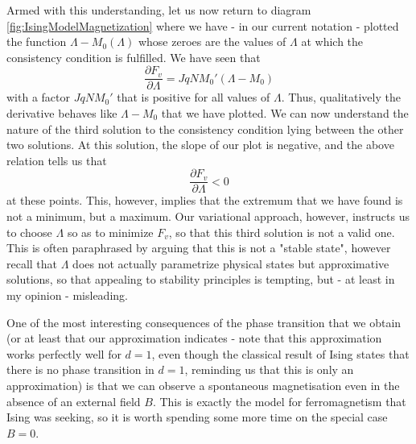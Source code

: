 \documentclass[a4paper, draft]{article}
\theoremstyle{own}
\theoremstyle{remark}
\begin{document}
Armed with this understanding, let us now return to diagram \ref{fig:IsingModelMagnetization} where we have - in our current notation - plotted the function $\Lambda - M_0(\Lambda)$ whose zeroes are the values of $\Lambda$ at which the consistency condition is fulfilled. We have seen that
$$
\frac{\partial F_v}{\partial \Lambda} = J  q N M_0' (\Lambda -   M_0) 
$$
with a factor $J q N M_0'$ that is positive for all values of $\Lambda$. Thus, qualitatively the derivative behaves like $\Lambda - M_0$ that we have plotted. We can now understand the nature of the third solution to the consistency condition lying between the other two solutions. At this solution, the slope of our plot is negative, and the above relation tells us that 
$$
\frac{\partial F_v}{\partial \Lambda} < 0
$$
at these points. This, however, implies that the extremum that we have found is not a minimum, but a maximum. Our variational approach, however, instructs us to choose $\Lambda$ so as to minimize $F_v$, so that this third solution is not a valid one. This is often paraphrased by arguing that this is not a "stable state", however recall that $\Lambda$ does not actually parametrize physical states but approximative solutions, so that appealing to stability principles is tempting, but - at least in my opinion - misleading.


One of the most interesting consequences of the phase transition that we obtain (or at least that our approximation indicates - note that this approximation works perfectly well for $d = 1$, even though the classical result of Ising states that there is no phase transition in $d = 1$, reminding us that this is only an approximation) is that we can observe a spontaneous magnetisation even in the absence of an external field $B$. This is exactly the model for ferromagnetism that Ising was seeking, so it is worth spending some more time on the special case $B = 0$. 		
\end{document}
